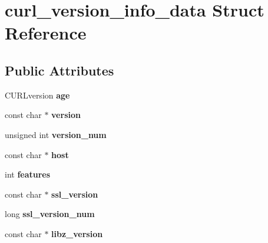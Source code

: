 \hypertarget{structcurl__version__info__data}{}\section{curl\+\_\+version\+\_\+info\+\_\+data Struct Reference}
\label{structcurl__version__info__data}
\subsection*{Public Attributes}
\begin{DoxyCompactItemize}
\item 
\mbox{\label{structcurl__version__info__data_adfe72a24d6f7ab569ea8d5cdc354f5b1}} 
C\+U\+R\+Lversion {\bfseries age}
\item 
\mbox{\label{structcurl__version__info__data_a9bb021a8a432cd8aa5e0e3adeabf3686}} 
const char $\ast$ {\bfseries version}
\item 
\mbox{\label{structcurl__version__info__data_a4afdf4d9449422e8741959683dd47985}} 
unsigned int {\bfseries version\+\_\+num}
\item 
\mbox{\label{structcurl__version__info__data_a517a6d3412aac497c17277827cb15b31}} 
const char $\ast$ {\bfseries host}
\item 
\mbox{\label{structcurl__version__info__data_ac2385fd807dd20c4c9ac67b397034e27}} 
int {\bfseries features}
\item 
\mbox{\label{structcurl__version__info__data_a554a618619178fdca44a5805d46f3c64}} 
const char $\ast$ {\bfseries ssl\+\_\+version}
\item 
\mbox{\label{structcurl__version__info__data_af732cc5f45e3df97e73160118ee7abf2}} 
long {\bfseries ssl\+\_\+version\+\_\+num}
\item 
\mbox{\label{structcurl__version__info__data_ab4d08fd4b161248fb517094ee9c9680f}} 
const char $\ast$ {\bfseries libz\+\_\+version}

\end{DoxyCompactItemize}
